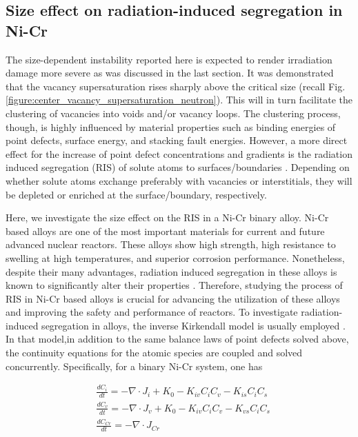 \documentclass[utf8]{frontiersSCNS} %
\begin{document}
\clearpage
\subsection{Size effect on radiation-induced segregation in Ni-Cr }

The size-dependent instability reported here is expected to render irradiation damage more severe as was discussed in the last section. It was demonstrated that the vacancy supersaturation rises sharply above the critical size (recall Fig. \ref{figure:center_vacancy_supersaturation_neutron}). This will in turn facilitate the clustering of vacancies into voids and/or vacancy loops. The clustering process, though, is highly influenced by material properties such as binding energies of point defects, surface energy, and stacking fault energies. However, a more direct effect for the increase of point defect concentrations and gradients is the radiation induced segregation (RIS) of solute atoms to surfaces/boundaries \citep{was2017}. Depending on whether solute atoms exchange preferably with vacancies or interstitials, they will be depleted or enriched at the surface/boundary, respectively.

Here, we investigate the size effect on the RIS in a Ni-Cr binary alloy. Ni-Cr based alloys are one of the most important materials for current and future advanced nuclear reactors. These alloys show high strength, high resistance to swelling at high temperatures, and superior corrosion performance. Nonetheless, despite their many advantages, radiation induced segregation in these alloys is known to significantly alter their properties \citep{allen_effect_1997,was_emulation_2002,allen_thermal_2007,wharry_systematic_2013}. Therefore, studying the process of RIS in Ni-Cr based alloys is crucial for advancing the utilization of these alloys and improving the safety and performance of reactors.
To investigate radiation-induced segregation in alloys, the inverse Kirkendall model is usually employed \citep{allen_modeling_1998,wharry_mechanism_2014,was2017}. In that model,in addition to the same balance laws of point defects solved above, the continuity equations for the atomic species are coupled and solved concurrently. Specifically, for a binary Ni-Cr system, one has \citep{barr_grain_2015}

    \begin{equation}
        \begin{aligned}
        &\frac{dC_i}{dt} = - \nabla\cdot J_i + K_0 - K_{iv}C_iC_v - K_{is}C_iC_s \\
        &\frac{dC_v}{dt} = - \nabla\cdot J_v + K_0 - K_{iv}C_iC_v - K_{vs}C_iC_s\\
        &\frac{dC_{Cr}}{dt} = - \nabla\cdot J_{Cr} \\
        \end{aligned}
        \label{equation:RIS_equations}
     \end{equation}
     
\end{document}
